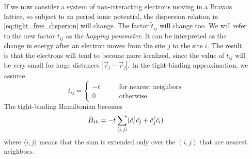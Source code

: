 If we now consider a system of non-interacting electrons moving in a Bravais lattice, so subject to an period ionic potential, the dispersion relation in \cref{eq:tight_free_disperion} will change. The factor $\tilde{t}_{ij}$ will change too. We will refer to the new factor $t_{ij}$ as the \emph{hopping parameter}. It can be interpreted as the change in energy after an electron moves from the site $j$ to the site $i$. The result is that the electrons will tend to become more localized, since the value of $t_{ij}$ will be very small for large distances $|\vec{r}_i - \vec{r}_j|$. In the tight-binding approximation, we assume
\begin{equation} \label{eq:tight_hamiltonian_position}
    t_{ij} =
    \begin{cases}
        -t \qquad                                     & \text{for nearest neighbors} \\
        0                                      \qquad & \text{otherwise}
    \end{cases}
\end{equation}
The tight-binding Hamiltonian becomes
\begin{equation}
    \hat{H}_\text{tb} = -t \sum_{\langle i,j \rangle} (\hat{c}^\dagger_i\hat{c_j} +  \hat{c}^\dagger_j\hat{c_i})
\end{equation}
where ${\langle i,j \rangle}$ means that the sum is extended only over the $(i,j)$ that are nearest neighbors.

